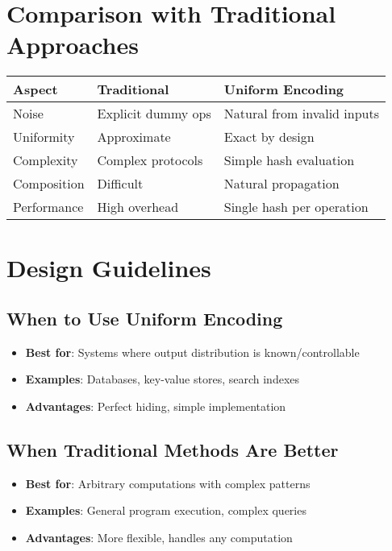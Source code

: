 \documentclass[11pt,final]{article}
\begin{document}
\section{Comparison with Traditional Approaches}

\begin{center}
\begin{tabular}{lll}
\textbf{Aspect} & \textbf{Traditional} & \textbf{Uniform Encoding} \\
\hline
Noise & Explicit dummy ops & Natural from invalid inputs \\
Uniformity & Approximate & Exact by design \\
Complexity & Complex protocols & Simple hash evaluation \\
Composition & Difficult & Natural propagation \\
Performance & High overhead & Single hash per operation \\
\end{tabular}
\end{center}

\section{Design Guidelines}

\subsection{When to Use Uniform Encoding}

\begin{itemize}
    \item \textbf{Best for}: Systems where output distribution is known/controllable
    \item \textbf{Examples}: Databases, key-value stores, search indexes
    \item \textbf{Advantages}: Perfect hiding, simple implementation
\end{itemize}

\subsection{When Traditional Methods Are Better}

\begin{itemize}
    \item \textbf{Best for}: Arbitrary computations with complex patterns
    \item \textbf{Examples}: General program execution, complex queries
    \item \textbf{Advantages}: More flexible, handles any computation
\end{itemize}
\end{document}
